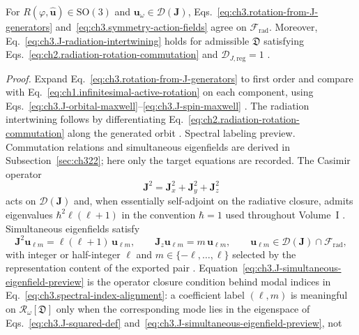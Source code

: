 \begin{proposition}
\label{prop:ch3.J-generates-rotations}
For \(R(\varphi,\hat{\mathbf{u}})\in\mathrm{SO}(3)\) and \(\mathbf{u}_\omega\in\mathcal{D}(\mathbf{J})\),
Eqs.~\eqref{eq:ch3.rotation-from-J-generators} and~\eqref{eq:ch3.symmetry-action-fields} agree on
\(\mathcal{F}_{\mathrm{rad}}\). Moreover, Eq.~\eqref{eq:ch3.J-radiation-intertwining} holds for admissible
\(\mathfrak{D}\) satisfying Eqs.~\eqref{eq:ch2.radiation-rotation-commutation} and
\(\mathcal{D}_{J,\mathrm{reg}}=1\) \cite{jackson1999}.
\end{proposition}
\noindent\textit{Proof.}
Expand Eq.~\eqref{eq:ch3.rotation-from-J-generators} to first order and compare with
Eq.~\eqref{eq:ch1.infinitesimal-active-rotation} on each component, using
Eqs.~\eqref{eq:ch3.J-orbital-maxwell}--\eqref{eq:ch3.J-spin-maxwell} \cite{jackson1999}. The
radiation intertwining follows by differentiating Eq.~\eqref{eq:ch2.radiation-rotation-commutation} along the
generated orbit \cite{stratton1941}.
Spectral labeling preview. Commutation relations and simultaneous eigenfields are derived in Subsection~\ref{sec:ch322}; here only the
target equations are recorded. The Casimir operator
\begin{equation}
\label{eq:ch3.J-squared-def}
\mathbf{J}^{2}
=
\mathbf{J}_{x}^{2}+\mathbf{J}_{y}^{2}+\mathbf{J}_{z}^{2}
\end{equation}
acts on \(\mathcal{D}(\mathbf{J})\) and, when essentially self-adjoint on the radiative closure, admits
eigenvalues \(\hbar^{2}\ell(\ell+1)\) in the convention \(\hbar=1\) used throughout Volume~I
\cite{jackson1999}. Simultaneous eigenfields satisfy
\begin{equation}
\label{eq:ch3.J-simultaneous-eigenfield-preview}
\mathbf{J}^{2}\mathbf{u}_{\ell m}
=
\ell(\ell+1)\,\mathbf{u}_{\ell m},
\qquad
\mathbf{J}_{z}\mathbf{u}_{\ell m}
=
m\,\mathbf{u}_{\ell m},
\qquad
\mathbf{u}_{\ell m}\in\mathcal{D}(\mathbf{J})\cap\mathcal{F}_{\mathrm{rad}},
\end{equation}
with integer or half-integer \(\ell\) and \(m\in\{-\ell,\ldots,\ell\}\) selected by the representation
content of the exported pair \cite{jackson1999}. Equation~\eqref{eq:ch3.J-simultaneous-eigenfield-preview}
is the operator closure condition behind modal indices in Eq.~\eqref{eq:ch3.spectral-index-alignment}: a coefficient
label \((\ell,m)\) is meaningful on \(\mathcal{R}_\omega[\mathfrak{D}]\) only when the corresponding mode lies
in the eigenspace of Eqs.~\eqref{eq:ch3.J-squared-def} and~\eqref{eq:ch3.J-simultaneous-eigenfield-preview}, not
